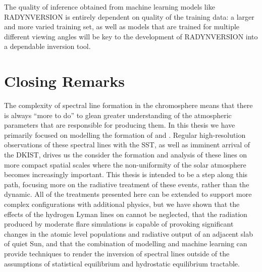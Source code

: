 The quality of inference obtained from machine learning models like RADYNVERSION is entirely dependent on quality of the training data: a larger and more varied training set, as well as models that are trained for multiple different viewing angles will be key to the development of RADYNVERSION into a dependable inversion tool.

\section*{Closing Remarks}

The complexity of spectral line formation in the chromosphere means that there is always ``more to do'' to glean greater understanding of the atmospheric parameters that are responsible for producing them.
In this thesis we have primarily focused on modelling the formation of \Ha{} and \CaLine{}.
Regular high-resolution observations of these spectral lines with the SST, as well as imminent arrival of the DKIST, drives us the consider the formation and analysis of these lines on more compact spatial scales where the non-uniformity of the solar atmosphere becomes increasingly important.
This thesis is intended to be a step along this path, focusing more on the radiative treatment of these events, rather than the dynamic.
All of the treatments presented here can be extended to support more complex configurations with additional physics, but we have shown that the effects of the hydrogen Lyman lines on \Caii{} cannot be neglected, that the radiation produced by moderate flare simulations is capable of provoking significant changes in the atomic level populations and radiative output of an adjacent slab of quiet Sun, and that the combination of modelling and machine learning can provide techniques to render the inversion of spectral lines outside of the assumptions of statistical equilibrium and hydrostatic equilibrium tractable.